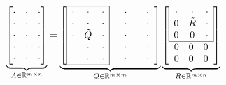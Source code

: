 \begin{equation*}
\underbrace{\begin{bmatrix}
\cdot  & \cdot  & \cdot \\
\cdot  & \cdot  & \cdot \\
\cdot  & \cdot  & \cdot \\
\cdot  & \cdot  & \cdot \\
\cdot  & \cdot  & \cdot
\end{bmatrix}}_{A\in \mathbb{R}^{m\times n}} =\underbrace{\begin{bmatrix}
\begin{array}{|c c c|}
\hline
\cdot  & \cdot  & \cdot \\
\cdot  & \cdot  & \cdot \\
\cdot  & \tilde{Q} & \cdot \\
\cdot  & \cdot  & \cdot \\
\cdot  & \cdot  & \cdot \\
\hline
\end{array} & \begin{array}{ c }
\cdot \\
\cdot \\
\cdot \\
\cdot \\
\cdot
\end{array} & \begin{array}{ c }
\cdot \\
\cdot \\
\cdot \\
\cdot \\
\cdot
\end{array}
\end{bmatrix}}_{Q\in \mathbb{R}^{m\times m}}\underbrace{\begin{bmatrix}
\begin{array}{|c c c|}
\hline
\cdot  & \cdot  & \cdot \\
0 & \tilde{R} & \cdot \\
0 & 0 & \cdot \\
\hline
\end{array}\\
\begin{array}{ c c c }
0 & 0 & 0
\end{array}\\
\begin{array}{ c c c }
0 & 0 & 0
\end{array}
\end{bmatrix}}_{R\in \mathbb{R}^{m\times n}}
\end{equation*}
